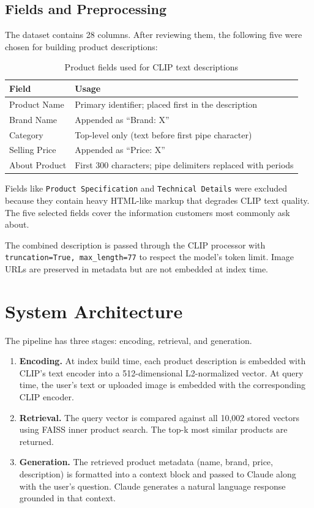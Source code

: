 \documentclass[11pt]{article}
\begin{document}
\subsection{Fields and Preprocessing}
The dataset contains 28 columns. After reviewing them, the following five were chosen for
building product descriptions:

\begin{table}[H]
\centering
\begin{tabular}{ll}
\toprule
\textbf{Field} & \textbf{Usage} \\
\midrule
Product Name     & Primary identifier; placed first in the description \\
Brand Name       & Appended as ``Brand: X'' \\
Category         & Top-level only (text before first pipe character) \\
Selling Price    & Appended as ``Price: X'' \\
About Product    & First 300 characters; pipe delimiters replaced with periods \\
\bottomrule
\end{tabular}
\caption{Product fields used for CLIP text descriptions}
\end{table}

Fields like \texttt{Product Specification} and \texttt{Technical Details} were excluded
because they contain heavy HTML-like markup that degrades CLIP text quality. The five
selected fields cover the information customers most commonly ask about.

The combined description is passed through the CLIP processor with
\texttt{truncation=True, max\_length=77} to respect the model's token limit.
Image URLs are preserved in metadata but are not embedded at index time.

\section{System Architecture}

The pipeline has three stages: encoding, retrieval, and generation.

\begin{enumerate}
    \item \textbf{Encoding.} At index build time, each product description is embedded with
    CLIP's text encoder into a 512-dimensional L2-normalized vector. At query time, the user's
    text or uploaded image is embedded with the corresponding CLIP encoder.
    \item \textbf{Retrieval.} The query vector is compared against all 10,002 stored vectors
    using FAISS inner product search. The top-k most similar products are returned.
    \item \textbf{Generation.} The retrieved product metadata (name, brand, price, description)
    is formatted into a context block and passed to Claude along with the user's question.
    Claude generates a natural language response grounded in that context.
\end{enumerate}
\end{document}
